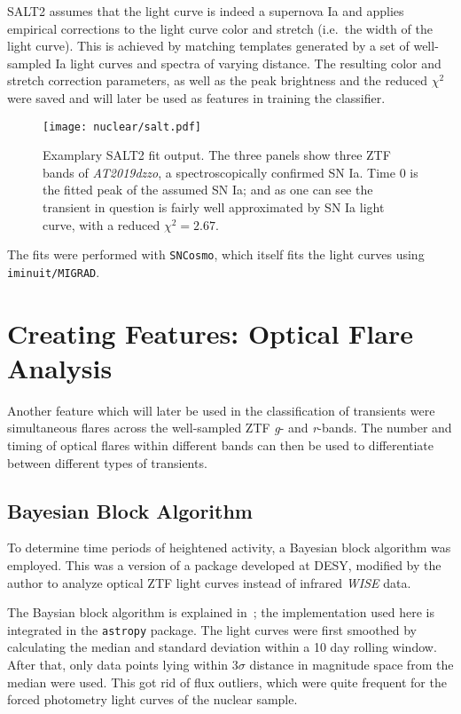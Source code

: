 SALT2 assumes that the light curve is indeed a supernova Ia and applies empirical corrections to the light curve color and stretch (i.e.~the width of the light curve). This is achieved by matching templates generated by a set of well-sampled Ia light curves and spectra of varying distance. The resulting color and stretch correction parameters, as well as the peak brightness and the reduced $\chi^2$ were saved and will later be used as features in training the classifier.

\begin{figure}[H]
  \texttt{[image: nuclear/salt.pdf]}
  \caption[SALT2 Fit]{Examplary SALT2 fit output. The three panels show three ZTF bands of \textit{AT2019dzzo}, a spectroscopically confirmed SN Ia. Time 0 is the fitted peak of the assumed SN Ia; and as one can see the transient in question is fairly well approximated by SN Ia light curve, with a reduced  $\chi^2=2.67$.}
\end{figure}

The fits were performed with \texttt{SNCosmo}, which itself fits the light curves using \texttt{iminuit/MIGRAD}.

\section{Creating Features: Optical Flare Analysis}\label{bayesian_blocks}
Another feature which will later be used in the classification of transients were simultaneous flares across the well-sampled ZTF \textit{g}- and \textit{r}-bands. The number and timing of optical flares within different bands can then be used to differentiate between different types of transients.

\subsection{Bayesian Block Algorithm}\label{bayesian_block}
To determine time periods of heightened activity, a Bayesian block algorithm was employed. This was a version of a package developed at DESY, modified by the author to analyze optical ZTF light curves instead of infrared \textit{WISE} data.

The Baysian block algorithm is explained in~; the implementation used here is integrated in the \texttt{astropy} package. The light curves were first smoothed by calculating the median and standard deviation within a 10 day rolling window. After that, only data points lying within $3 \sigma$ distance in magnitude space from the median were used. This got rid of flux outliers, which were quite frequent for the forced photometry light curves of the nuclear sample.

